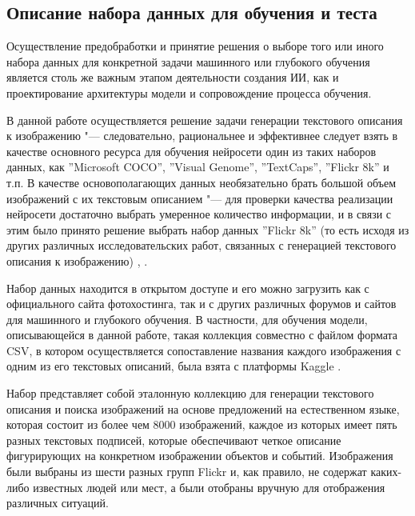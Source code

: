 \documentclass[bachelor, och, coursework]{SCWorks}
\begin{document}
    \subsection{Описание набора данных для обучения и теста}

        Осуществление предобработки и принятие решения о выборе того или иного
        набора данных для конкретной задачи машинного или глубокого обучения
        является столь же важным этапом деятельности создания ИИ, как и
        проектирование архитектуры модели и сопровождение процесса обучения.

        В данной работе осуществляется решение задачи генерации текстового
        описания к изображению "--- следовательно, рациональнее и эффективнее
        следует взять в качестве основного ресурса для обучения нейросети один
        из таких наборов данных, как ''Microsoft COCO'', ''Visual Genome'',
        ''TextCaps'', ''Flickr 8k'' и т.п. В качестве основополагающих данных
        необязательно брать большой объем изображений с их текстовым описанием
        "--- для проверки качества реализации нейросети достаточно выбрать
        умеренное количество информации, и в связи с этим было принято решение
        выбрать набор данных ''Flickr 8k'' (то есть исходя из других различных
        исследовательских работ, связанных с генерацией текстового описания к
        изображению) \cite{dataset1}, \cite{dataset2}.
        
        Набор данных находится в открытом доступе и его можно загрузить как с
        официального сайта фотохостинга, так и с других различных форумов и
        сайтов для машинного и глубокого обучения. В частности, для обучения
        модели, описывающейся в данной работе, такая коллекция совместно с
        файлом формата CSV, в котором осуществляется сопоставление названия
        каждого изображения с одним из его текстовых описаний, была взята с
        платформы Kaggle \cite{dataset3}.

        Набор представляет собой эталонную коллекцию для генерации текстового
        описания и поиска изображений на основе предложений на естественном
        языке, которая состоит из более чем 8000 изображений, каждое из которых
        имеет пять разных текстовых подписей, которые обеспечивают четкое
        описание фигурирующих на конкретном изображении объектов и событий.
        Изображения были выбраны из шести разных групп Flickr и, как правило, не
        содержат каких-либо известных людей или мест, а были отобраны вручную
        для отображения различных ситуаций.
\end{document}
